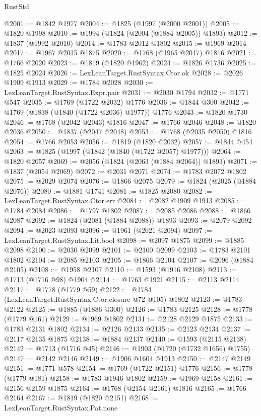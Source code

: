 \begin{lexlean}{RustStd}
\begin{coremodule}
@2001 := @1842 @1977
@2004 := @1825 (@1997 (@2000 @2001))
@2005 := @1820 @1998
@2010 := @1994 (@1824 (@2004 (@1884 @2005)) @1893)
@2012 := @1837 (@1992 @2010)
@2014 := @1783 @2012 @1802
@2015 := @1969 @2014
@2017 := @1967 @2015 @1875
@2020 := @1768 (@1965 @2017) @1816
@2021 := @1766 @2020
@2023 := @1819 (@1820 @1962)
@2024 := @1826 @1736
@2025 := @1825 @2024
@2026 := LexLeanTarget.RustSyntax.Ctor.ok
@2028 := @2026 @1909 @1913
@2029 := @1784 @2028
@2030 := LexLeanTarget.RustSyntax.Expr.pair
@2031 := @2030 @1794
@2032 := @1771 @547
@2035 := @1769 (@1722 @2032) @1776
@2036 := @1844 @300
@2042 := @1769 (@1838 (@1840 (@1722 @2036) @1977)) @1776
@2043 := @1820 @1730
@2046 := @1768 (@2042 @2043) @1816
@2047 := @1766 @2046
@2048 := @1820 @2036
@2050 := @1837 (@2047 @2048)
@2053 := @1768 (@2035 @2050) @1816
@2054 := @1766 @2053
@2056 := @1819 (@1820 @2032)
@2057 := @1844 @454
@2063 := @1825 (@1997 (@1842 (@1840 (@1722 @2057) @1977)))
@2064 := @1820 @2057
@2069 := @2056 (@1824 (@2063 (@1884 @2064)) @1893)
@2071 := @1837 (@2054 @2069)
@2072 := @2031 @2071
@2074 := @1783 @2072 @1802
@2075 := @2029 @2074
@2076 := @1866 @2075
@2079 := @1824 (@2025 (@1884 @2076))
@2080 := @1881 @1741
@2081 := @1825 @2080
@2082 := LexLeanTarget.RustSyntax.Ctor.err
@2084 := @2082 @1909 @1913
@2085 := @1784 @2084
@2086 := @1797 @1802
@2087 := @2085 @2086
@2088 := @1866 @2087
@2092 := @1824 (@2081 (@1884 @2088)) @1893
@2093 := @2079 @2092
@2094 := @2023 @2093
@2096 := @1961 (@2021 @2094)
@2097 := LexLeanTarget.RustSyntax.Lit.bool
@2098 := @2097 @1875
@2099 := @1885 @2098
@2100 := @2030 @2099
@2101 := @2100 @2099
@2103 := @1783 @2101 @1802
@2104 := @2085 @2103
@2105 := @1866 @2104
@2107 := @2096 (@1884 @2105)
@2108 := @1958 @2107
@2110 := @1593 (@1916 @2108)
@2113 := @1713 (@1716 @98) @1904
@2114 := @1763 @1921
@2115 := @2113 @2114
@2117 := @1778 (@1779 @59)
@2122 := @1784 (LexLeanTarget.RustSyntax.Ctor.closure @72 @105) @1802
@2123 := @1783 @2122
@2125 := @1885 (@1886 @300)
@2126 := @1783 @2125
@2128 := @1778 (@1779 @161)
@2129 := @1969 @1802
@2131 := @2128 @2129 @1875
@2133 := @1783 @2131 @1802
@2134 := @2126 @2133
@2135 := @2123 @2134
@2137 := @2117 @2135 @1875
@2138 := @1884 @2137
@2140 := @1593 (@2115 @2138)
@2142 := @1713 (@1716 @45)
@2146 := @1903 (@1720 (@1732 @1656) @1755)
@2147 := @2142 @2146
@2149 := @1906 @1604 @1913
@2150 := @2147 @2149
@2151 := @1771 @578
@2154 := @1769 (@1722 @2151) @1776
@2156 := @1778 (@1779 @181)
@2158 := @1783 @1946 @1802
@2159 := @1969 @2158
@2161 := @2156 @2159 @1875
@2164 := @1768 (@2154 @2161) @1816
@2165 := @1766 @2164
@2167 := @1819 (@1820 @2151)
@2168 := LexLeanTarget.RustSyntax.Pat.none

\end{coremodule}
\end{lexlean}
